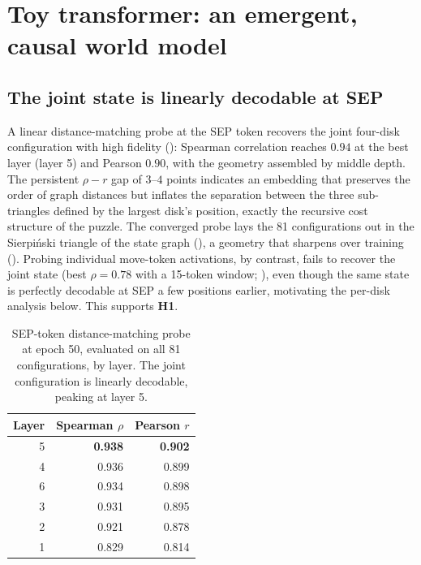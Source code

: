 \documentclass{article} %
\begin{document}
\section{Toy transformer: an emergent, causal world model}
\label{sec:toy}

\subsection{The joint state is linearly decodable at SEP}

A linear distance-matching probe at the SEP token recovers the joint four-disk configuration with high fidelity (): Spearman correlation reaches $0.94$ at the best layer (layer 5) and Pearson $0.90$, with the geometry assembled by middle depth. The persistent $\rho{-}r$ gap of $3$--$4$ points indicates an embedding that preserves the order of graph distances but inflates the separation between the three sub-triangles defined by the largest disk's position, exactly the recursive cost structure of the puzzle. The converged probe lays the 81 configurations out in the Sierpi\'nski triangle of the state graph (), a geometry that sharpens over training (). Probing individual move-token activations, by contrast, fails to recover the joint state (best $\rho=0.78$ with a 15-token window; ), even though the same state is perfectly decodable at SEP a few positions earlier, motivating the per-disk analysis below. This supports \textbf{H1}.

\begin{table}[t]
\centering
\caption{SEP-token distance-matching probe at epoch 50, evaluated on all 81 configurations, by layer. The joint configuration is linearly decodable, peaking at layer 5.}
\label{tab:sep-probe}
\begin{tabular}{rrr}
\toprule
\textbf{Layer} & \textbf{Spearman $\rho$} & \textbf{Pearson $r$} \\
\midrule
5 & \textbf{0.938} & \textbf{0.902} \\
4 & 0.936 & 0.899 \\
6 & 0.934 & 0.898 \\
3 & 0.931 & 0.895 \\
2 & 0.921 & 0.878 \\
1 & 0.829 & 0.814 \\
\bottomrule
\end{tabular}
\end{table}
\end{document}
